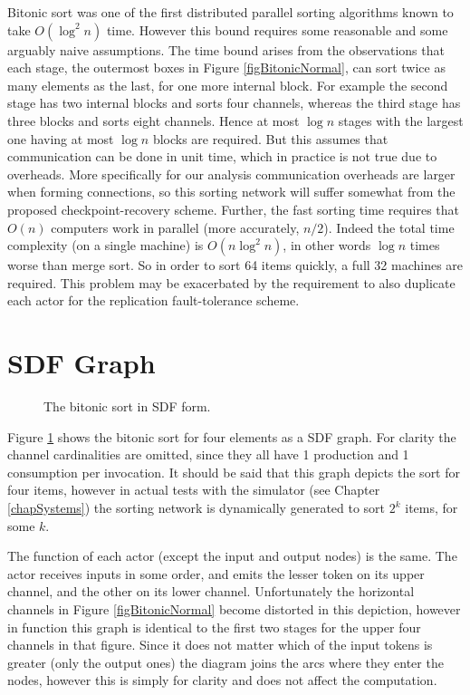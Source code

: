 Bitonic sort was one of the first distributed parallel sorting algorithms known to take $O(\log^2 n)$ time.
However this bound requires some reasonable and some arguably naive assumptions.
The time bound arises from the observations that each stage, the outermost boxes in Figure \ref{figBitonicNormal}, can sort twice as many elements as the last, for one more internal block.
For example the second stage has two internal blocks and sorts four channels, whereas the third stage has three blocks and sorts eight channels.
Hence at most $\log n$ stages with the largest one having at most $\log n$ blocks are required.
But this assumes that communication can be done in unit time, which in practice is not true due to overheads.
More specifically for our analysis communication overheads are larger when forming connections, so this sorting network will suffer somewhat from the proposed checkpoint-recovery scheme.
Further, the fast sorting time requires that $O(n)$ computers work in parallel (more accurately, $n/2$).
Indeed the total time complexity (on a single machine) is $O(n \log^2 n)$, in other words $\log n$ times worse than merge sort.
So in order to sort 64 items quickly, a full 32 machines are required.
This problem may be exacerbated by the requirement to also duplicate each actor for the replication fault-tolerance scheme.

\section{SDF Graph}

\begin{figure}
\begin{center}
	
\caption{The bitonic sort in SDF form.}
\label{figBitonicGraph}
\end{center}
\end{figure}

Figure \ref{figBitonicGraph} shows the bitonic sort for four elements as a SDF graph.
For clarity the channel cardinalities are omitted, since they all have 1 production and 1 consumption per invocation.
It should be said that this graph depicts the sort for four items, however in actual tests with the simulator (see Chapter \ref{chapSystems}) the sorting network is dynamically generated to sort $2^k$ items, for some $k$.

The function of each actor (except the input and output nodes) is the same.
The actor receives inputs in some order, and emits the lesser token on its upper channel, and the other on its lower channel.
Unfortunately the horizontal channels in Figure \ref{figBitonicNormal} become distorted in this depiction, however in function this graph is identical to the first two stages for the upper four channels in that figure.
Since it does not matter which of the input tokens is greater (only the output ones) the diagram joins the arcs where they enter the nodes, however this is simply for clarity and does not affect the computation.

